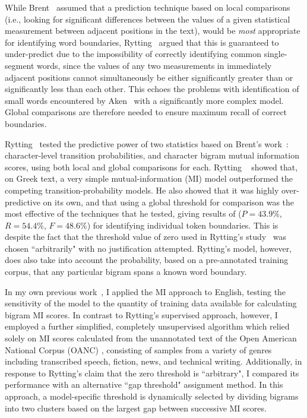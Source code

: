 While Brent~\cite{brent99} assumed that a prediction technique based on local comparisons (i.e., looking for significant differences between the values of a given statistical measurement between adjacent positions in the text), would be \textit{most} appropriate for identifying word boundaries, Rytting~\cite{rytting04} argued that this is guaranteed to under-predict due to the impossibility of correctly identifying common single-segment words, since the values of any two measurements in immediately adjacent positions cannot simultaneously be either significantly greater than or significantly less than each other. This echoes the problems with identification of small words encountered by Aken~\cite{aken11} with a significantly more complex model. Global comparisons are therefore needed to ensure maximum recall of correct boundaries.

Rytting~\cite{rytting04} tested the predictive power of two statistics based on Brent's work~\cite{brent99}: character-level transition probabilities, and character bigram mutual information scores, using both local and global comparisons for each. Rytting ~\cite{rytting04} showed that, on Greek text, a very simple mutual-information (MI) model outperformed the competing transition-probability models. He also showed that it was highly over-predictive on its own, and that using a global threshold for comparison was the most effective of the techniques that he tested, giving results of ($P = 43.9\%$, $R = 54.4\%$, $F = 48.6\%$) for identifying individual token boundaries. This is despite the fact that the threshold value of zero used in Rytting's study~\cite{rytting04} was chosen ``arbitrarily" with no justification attempted. Rytting's model, however, does also take into account the probability, based on a pre-annotated training corpus, that any particular bigram spans a known word boundary.

In my own previous work~\cite{kearsley14}, I applied the MI approach to English, testing the sensitivity of the model to the quantity of training data available for calculating bigram MI scores. In contrast to Rytting's supervised approach, however, I employed a further simplified, completely unsupervised algorithm which relied solely on MI scores calculated from the unannotated text of the Open American National Corpus (OANC) \cite{oanc}, consisting of samples from a variety of genres including transcribed speech, fiction, news, and technical writing. Additionally, in response to Rytting's claim that the zero threshold is ``arbitrary", I compared its performance with an alternative ``gap threshold" assignment method. In this approach, a model-specific threshold is dynamically selected by dividing bigrams into two clusters based on the largest gap between successive MI scores.

